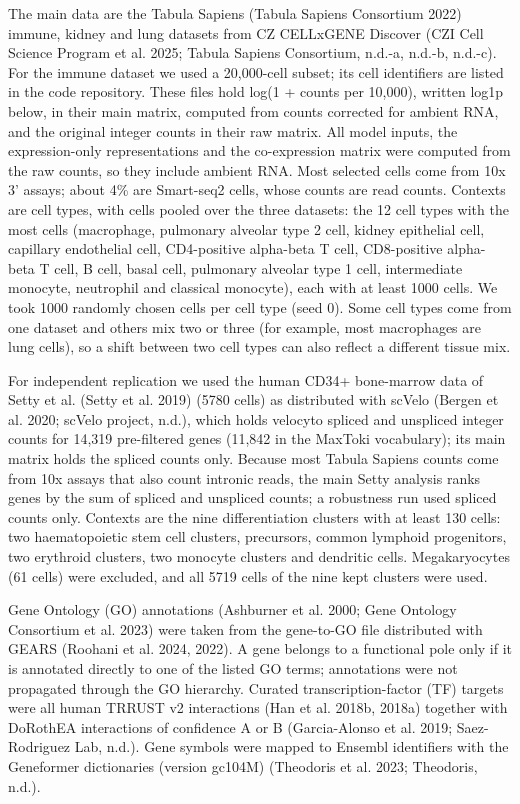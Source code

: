 \documentclass[
  11pt,
]{article}
\begin{document}
The main data are the Tabula Sapiens (Tabula Sapiens Consortium 2022)
immune, kidney and lung datasets from CZ CELLxGENE Discover ({CZI Cell
Science Program et al.} 2025; Tabula Sapiens Consortium, n.d.-a, n.d.-b,
n.d.-c). For the immune dataset we used a 20,000-cell subset; its cell
identifiers are listed in the code repository. These files hold log(1 +
counts per 10,000), written log1p below, in their main matrix, computed
from counts corrected for ambient RNA, and the original integer counts
in their raw matrix. All model inputs, the expression-only
representations and the co-expression matrix were computed from the raw
counts, so they include ambient RNA. Most selected cells come from 10x
3' assays; about 4\% are Smart-seq2 cells, whose counts are read counts.
Contexts are cell types, with cells pooled over the three datasets: the
12 cell types with the most cells (macrophage, pulmonary alveolar type 2
cell, kidney epithelial cell, capillary endothelial cell, CD4-positive
alpha-beta T cell, CD8-positive alpha-beta T cell, B cell, basal cell,
pulmonary alveolar type 1 cell, intermediate monocyte, neutrophil and
classical monocyte), each with at least 1000 cells. We took 1000
randomly chosen cells per cell type (seed 0). Some cell types come from
one dataset and others mix two or three (for example, most macrophages
are lung cells), so a shift between two cell types can also reflect a
different tissue mix.

For independent replication we used the human CD34+ bone-marrow data of
Setty et al. (Setty et al. 2019) (5780 cells) as distributed with scVelo
(Bergen et al. 2020; {scVelo project}, n.d.), which holds velocyto
spliced and unspliced integer counts for 14,319 pre-filtered genes
(11,842 in the MaxToki vocabulary); its main matrix holds the spliced
counts only. Because most Tabula Sapiens counts come from 10x assays
that also count intronic reads, the main Setty analysis ranks genes by
the sum of spliced and unspliced counts; a robustness run used spliced
counts only. Contexts are the nine differentiation clusters with at
least 130 cells: two haematopoietic stem cell clusters, precursors,
common lymphoid progenitors, two erythroid clusters, two monocyte
clusters and dendritic cells. Megakaryocytes (61 cells) were excluded,
and all 5719 cells of the nine kept clusters were used.

Gene Ontology (GO) annotations ({Ashburner et al.} 2000; {Gene Ontology
Consortium et al.} 2023) were taken from the gene-to-GO file distributed
with GEARS (Roohani et al. 2024, 2022). A gene belongs to a functional
pole only if it is annotated directly to one of the listed GO terms;
annotations were not propagated through the GO hierarchy. Curated
transcription-factor (TF) targets were all human TRRUST v2 interactions
({Han et al.} 2018b, 2018a) together with DoRothEA interactions of
confidence A or B (Garcia-Alonso et al. 2019; Saez-Rodriguez Lab, n.d.).
Gene symbols were mapped to Ensembl identifiers with the Geneformer
dictionaries (version gc104M) (Theodoris et al. 2023; Theodoris, n.d.).
\end{document}
